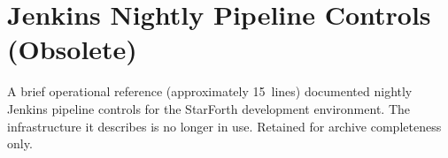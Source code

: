 
\section*{Jenkins Nightly Pipeline Controls (Obsolete)}

A brief operational reference (approximately 15~lines) documented nightly
Jenkins pipeline controls for the StarForth development environment. The
infrastructure it describes is no longer in use. Retained for archive
completeness only.
